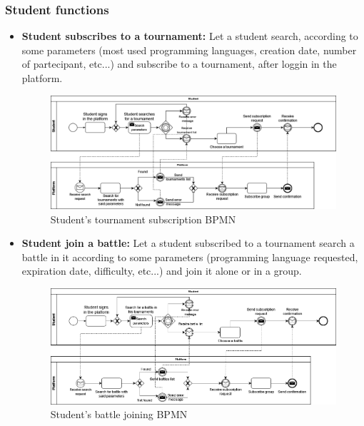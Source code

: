 \documentclass{article}
\begin{document}
{\subsubsection{Student functions}
\begin{itemize}
    \item \textbf{Student subscribes to a tournament:} Let a student search, according to some parameters (most used programming languages, creation date, number of partecipant, etc...) and subscribe to a tournament, after loggin in the platform.
          \begin{figure}[H]
              \centering
              \hspace*{-1.1cm}\includegraphics[scale=0.4]{images/BPMN/BPMN3.png}
              \caption{Student's tournament subscription BPMN}
              \label{fig:studTournamentSubBPMN}
          \end{figure}

    \item \textbf{Student join a battle:} Let a student subscribed to a tournament search a battle in it according to some parameters (programming language requested, expiration date, difficulty, etc...) and join it alone or in a group.
          \begin{figure}[H]
              \centering
              \hspace*{-1.1cm}\includegraphics[scale=0.4]{images/BPMN/BPMN4.png}
              \caption{Student's battle joining BPMN}
              \label{fig:studBattleJoinBPMN}
          \end{figure}


\end{itemize}}
\end{document}
